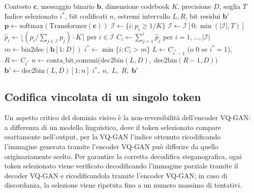 \begin{algorithm}[tbhp]
\caption{Selezione steganografica del token visivo}
\label{alg:selezione-token}
\begin{algorithmic}[1]
\Require Contesto $\mathbf{c}$, messaggio binario $\mathbf{b}$, dimensione codebook $K$, precisione $D$, soglia $T$
\Ensure Indice selezionato $i^*$, bit codificati $n$, estremi intervallo $L, R$, bit residui $\mathbf{b}'$
\State $\mathbf{p} \gets \mathrm{softmax}(\mathrm{Transformer}(\mathbf{c}))$
\State $\mathcal{I} \gets \{i : p_i \ge 1/K\}$ 
\State $\mathcal{I} \gets \mathcal{I}[0:\min(|\mathcal{I}|, T)]$ 
\State $\hat{p}_i \gets \bigl\lfloor (p_i / \textstyle\sum_{j \in \mathcal{I}} p_j) \cdot K \bigr\rceil$ per $i \in \mathcal{I}$
\State $C_i \gets \textstyle\sum_{j=1}^{i} \hat{p}_j$ per $i = 1, \dots, |\mathcal{I}|$ 
\State $m \gets \mathrm{bin2dec}(\mathbf{b}[1:D])$ 
\State $i^* \gets \min\{i : C_i > m\}$ 
\State $L \gets C_{i^*-1}$ (o $0$ se $i^*=1$),\quad $R \gets C_{i^*}$ 
\State $n \gets \mathrm{conta\_bit\_comuni}\bigl(\mathrm{dec2bin}(L, D),\; \mathrm{dec2bin}(R-1, D)\bigr)$
\State $\mathbf{b}' \gets \mathrm{dec2bin}(L, D)[1:n]$
\State \Return $i^*,\; n,\; L,\; R,\; \mathbf{b}'$
\end{algorithmic}
\end{algorithm}

\subsection{Codifica vincolata di un singolo token}

Un aspetto critico del dominio visivo è la non-reversibilità dell'encoder VQ-GAN: a differenza di un modello linguistico, dove il token selezionato compare esattamente nell'output, per la VQ-GAN l'indice ottenuto ricodificando l'immagine generata tramite l'encoder VQ-GAN può differire da quello originariamente scelto. Per garantire la corretta decodifica steganografica, ogni token selezionato viene verificato decodificando l'immagine parziale tramite il decoder VQ-GAN e ricodificandola tramite l'encoder VQ-GAN; in caso di discordanza, la selezione viene ripetuta fino a un numero massimo di tentativi.

